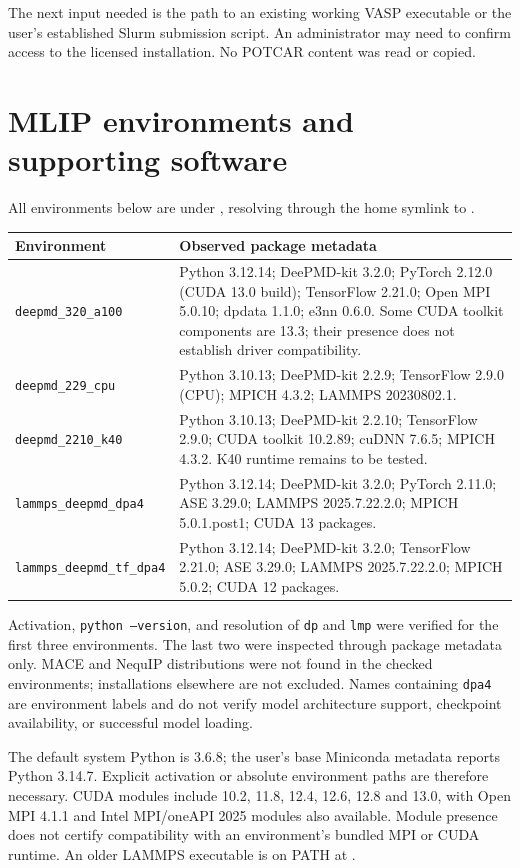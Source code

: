 \documentclass[10pt,a4paper]{article}
\begin{document}
The next input needed is the path to an existing working VASP executable or
the user's established Slurm submission script. An administrator may need to
confirm access to the licensed installation. No POTCAR content was read or copied.

\section{MLIP environments and supporting software}
All environments below are under , resolving
through the home symlink to .

\begin{tabularx}{\linewidth}{@{}lX@{}}
\toprule
Environment & Observed package metadata \\
\midrule
\texttt{deepmd\_320\_a100} & Python 3.12.14; DeePMD-kit 3.2.0; PyTorch 2.12.0
(CUDA 13.0 build); TensorFlow 2.21.0; Open MPI 5.0.10; dpdata 1.1.0; e3nn 0.6.0.
Some CUDA toolkit components are 13.3; their presence does not establish driver compatibility. \\
\texttt{deepmd\_229\_cpu} & Python 3.10.13; DeePMD-kit 2.2.9; TensorFlow 2.9.0
(CPU); MPICH 4.3.2; LAMMPS 20230802.1. \\
\texttt{deepmd\_2210\_k40} & Python 3.10.13; DeePMD-kit 2.2.10; TensorFlow 2.9.0;
CUDA toolkit 10.2.89; cuDNN 7.6.5; MPICH 4.3.2. K40 runtime remains to be tested. \\
\texttt{lammps\_deepmd\_dpa4} & Python 3.12.14; DeePMD-kit 3.2.0; PyTorch 2.11.0;
ASE 3.29.0; LAMMPS 2025.7.22.2.0; MPICH 5.0.1.post1; CUDA 13 packages. \\
\texttt{lammps\_deepmd\_tf\_dpa4} & Python 3.12.14; DeePMD-kit 3.2.0;
TensorFlow 2.21.0; ASE 3.29.0; LAMMPS 2025.7.22.2.0; MPICH 5.0.2; CUDA 12 packages. \\
\bottomrule
\end{tabularx}

Activation, \texttt{python --version}, and resolution of \texttt{dp} and
\texttt{lmp} were verified for the first three environments. The last two were
inspected through package metadata only. MACE and NequIP distributions were not
found in the checked environments; installations elsewhere are not excluded.
Names containing \texttt{dpa4} are environment labels and do not verify model
architecture support, checkpoint availability, or successful model loading.

The default system Python is 3.6.8; the user's base Miniconda metadata reports
Python 3.14.7. Explicit activation or absolute environment paths are therefore
necessary. CUDA modules include 10.2, 11.8, 12.4, 12.6, 12.8 and 13.0, with
Open MPI 4.1.1 and Intel MPI/oneAPI 2025 modules also available. Module presence
does not certify compatibility with an environment's bundled MPI or CUDA runtime.
An older LAMMPS executable is on PATH at
.
\end{document}

